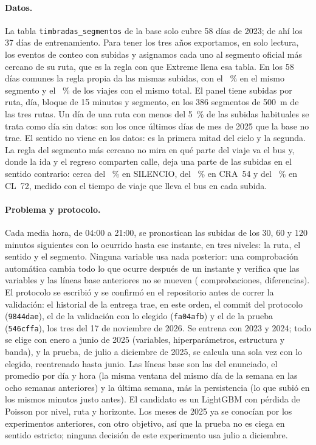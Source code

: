 \paragraph{Datos.} La tabla \texttt{timbradas\_segmentos} de la base solo cubre 58 días de 2023; de ahí los 37 días
de entrenamiento. Para tener los tres años exportamos, en solo lectura, los \CPEventos{} eventos de conteo con subidas
y asignamos cada uno al segmento oficial más cercano de su ruta, que es la regla con que Extreme llena esa tabla. En
los 58 días comunes la regla propia da las mismas \CPVerSubidas{} subidas, con el \CPVerMismoSegmento~\% en el mismo
segmento y el \CPVerMismoTotal~\% de los viajes con el mismo total. El panel tiene \CPSubidas{} subidas por ruta, día,
bloque de 15 minutos y segmento, en los 386 segmentos de 500~m de las tres rutas. Un día de una ruta con menos del
5~\% de las subidas habituales se trata como día sin datos: son los once últimos días de mes de 2025 que la base no
trae. El sentido no viene en los datos:  es la primera mitad del ciclo y  la segunda. La
regla del segmento más cercano no mira en qué parte del viaje va el bus y, donde la ida y el regreso comparten calle,
deja una parte de las subidas en el sentido contrario: cerca del \CPSentOtroSil~\% en SILENCIO, del \CPSentOtroCra~\%
en CRA~54 y del \CPSentOtroCl~\% en CL~72, medido con el tiempo de viaje que lleva el bus en cada subida.

\paragraph{Problema y protocolo.} Cada media hora, de 04:00 a 21:00, se pronostican las subidas de los 30, 60 y 120
minutos siguientes con lo ocurrido hasta ese instante, en tres niveles: la ruta, el sentido y el segmento. Ninguna
variable usa nada posterior: una comprobación automática cambia todo lo que ocurre después de un instante y verifica
que las variables y las líneas base anteriores no se mueven (\CPFugaComprobaciones{} comprobaciones,
\CPFugaDiferencias{} diferencias). El
protocolo se escribió y se confirmó en el repositorio antes de correr la validación: el historial de la entrega trae, en este
orden, el commit del protocolo (\texttt{9844dae}), el de la validación con lo elegido (\texttt{fa04afb}) y el de la
prueba (\texttt{546cffa}), los tres del 17 de noviembre de 2026. Se entrena con 2023 y 2024; todo se elige
con enero a junio de 2025 (variables, hiperparámetros, estructura y banda), y la prueba, de julio a diciembre de 2025,
se calcula una sola vez con lo elegido, reentrenado hasta junio. Las líneas base son las del enunciado, el promedio
por día y hora (la misma ventana del mismo día de la semana en las ocho semanas anteriores) y la última semana, más la
persistencia (lo que subió en los mismos minutos justo antes). El candidato es un LightGBM con pérdida de Poisson por
nivel, ruta y horizonte. Los meses de 2025 ya se conocían por los experimentos anteriores, con otro objetivo, así que
la prueba no es ciega en sentido estricto; ninguna decisión de este experimento usa julio a diciembre.


